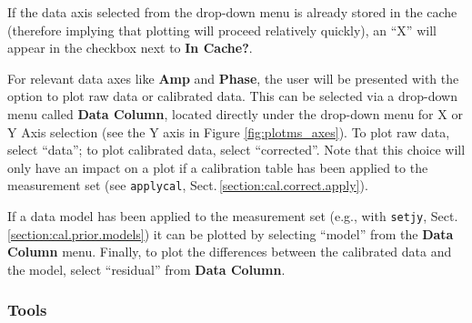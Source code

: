 If the data axis selected from the drop-down menu is already stored in
the cache (therefore implying that plotting will proceed relatively
quickly), an ``X'' will appear in the checkbox next to {\bf In
  Cache?}.

For relevant data axes like {\bf Amp} and {\bf Phase}, the user will
be presented with the option to plot raw data or calibrated data. This
can be selected via a drop-down menu called {\bf Data Column}, located
directly under the drop-down menu for X or Y Axis selection (see the Y
axis in Figure \ref{fig:plotms_axes}). To plot raw data, select
``data''; to plot calibrated data, select ``corrected''. Note that
this choice will only have an impact on a plot if a calibration table
has been applied to the measurement set (see {\tt applycal},
Sect.\,\ref{section:cal.correct.apply}).

If a data model has been applied to the measurement set (e.g., with
{\tt setjy}, Sect.\,\ref{section:cal.prior.models}) it can be plotted
by selecting ``model'' from the {\bf Data Column} menu. Finally, to
plot the differences between the calibrated data and the model, select
``residual'' from {\bf Data Column}.


\subsubsection{Tools}
\label{section:edit.plot.plotms.tools}

